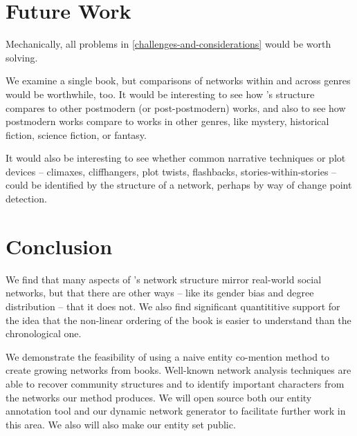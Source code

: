 \section{Future Work}

Mechanically, all problems in \ref{challenges-and-considerations} would be worth solving. 

We examine a single book, but comparisons of networks within and across genres would be worthwhile, too. It would be interesting to see how \infinitejest's structure compares to other postmodern (or post-postmodern) works, and also to see how postmodern works compare to works in other genres, like mystery, historical fiction, science fiction, or fantasy.

It would also be interesting to see whether common narrative techniques or plot devices -- climaxes, cliffhangers, plot twists, flashbacks, stories-within-stories -- could be identified by the structure of a network, perhaps by way of change point detection.

\section{Conclusion}

We find that many aspects of \infinitejest's network structure mirror real-world social networks, but that there are other ways -- like its gender bias and degree distribution -- that it does not. We also find significant quantititive support for the idea that the non-linear ordering of the book is easier to understand than the chronological one.

We demonstrate the feasibility of using a naive entity co-mention method to create growing networks from books. Well-known network analysis techniques are able to recover community structures and to identify important characters from the networks our method produces. We will open source both our entity annotation tool and our dynamic network generator to facilitate further work in this area. We also will also make our \infinitejest entity set public.



